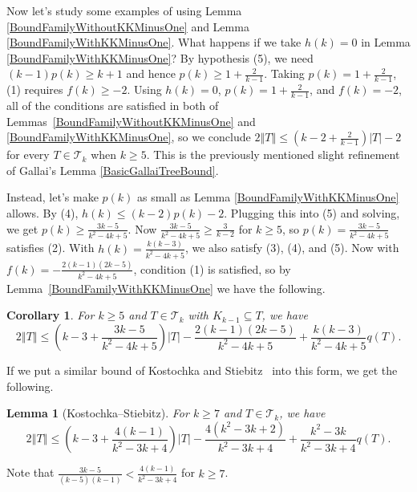 \documentclass[12pt]{article}
\theoremstyle{plain}
\newtheorem{lem}[thm]{Lemma}
\newtheorem{cor}[thm]{Corollary}
\theoremstyle{definition}
\theoremstyle{remark}
\newcommand{\fancy}[1]{\mathcal{#1}}
\newcommand{\T}{\fancy{T}}
\newcommand{\card}[1]{\left|#1\right|}
\newcommand{\size}[1]{\left\Vert#1\right\Vert}
\newcommand{\parens}[1]{\left( #1 \right)}
\begin{document}
Now let's study some examples of using Lemma \ref{BoundFamilyWithoutKKMinusOne}
and Lemma \ref{BoundFamilyWithKKMinusOne}.  What happens if we take $h(k) = 0$
in Lemma \ref{BoundFamilyWithKKMinusOne}?  By hypothesis (5), we need
$(k-1)p(k) \ge k + 1$ and hence $p(k) \ge 1 + \frac{2}{k-1}$.  Taking $p(k) = 1 +
\frac{2}{k-1}$, (1) requires $f(k) \ge -2$.  Using $h(k)=0$,
$p(k)=1+\frac2{k-1}$, and $f(k) = -2$, all of the conditions are satisfied in
both of Lemmas~\ref{BoundFamilyWithoutKKMinusOne} and
\ref{BoundFamilyWithKKMinusOne}, so we conclude $2\size{T} \le \parens{k-2 +
\frac{2}{k-1}}\card{T} - 2$ for every $T \in \T_k$ when $k \ge 5$.  This is the
previously mentioned slight refinement of Gallai's Lemma \ref{BasicGallaiTreeBound}.

Instead, let's make $p(k)$ as small as Lemma \ref{BoundFamilyWithKKMinusOne}
allows. By (4), $h(k) \le (k-2)p(k) - 2$. Plugging this into (5) and solving,
we get $p(k) \ge \frac{3k-5}{k^2 - 4k + 5}$.  Now $\frac{3k-5}{k^2 - 4k + 5}
\ge \frac{3}{k-2}$ for $k \ge 5$, so $p(k) = \frac{3k-5}{k^2 - 4k + 5}$
satisfies (2).  With $h(k) = \frac{k(k-3)}{k^2 - 4k + 5}$, we also satisfy (3),
(4), and (5).  Now with $f(k) = -\frac{2(k-1)(2k-5)}{k^2 - 4k + 5}$, condition
(1) is satisfied, so by Lemma~\ref{BoundFamilyWithKKMinusOne} we have the following.

\begin{cor}\label{SmallP}
	For $k \ge 5$ and $T \in \T_k$ with $K_{k-1} \subseteq T$, we have
	\[2\size{T} \le \parens{k-3 + \frac{3k-5}{k^2 - 4k + 5}}\card{T} - \frac{2(k-1)(2k-5)}{k^2 - 4k + 5} + 
	\frac{k(k-3)}{k^2 - 4k + 5}q(T).\]
\end{cor}

If we put a similar bound of Kostochka and
Stiebitz~\cite{kostochkastiebitzedgesincriticalgraph} into this form, we get
the following.
\begin{lem}[Kostochka--Stiebitz]




		For $k \ge 7$ and $T \in \T_k$, we have
		\[2\size{T} \le \parens{k-3 + \frac{4(k-1)}{k^2 - 3k + 4}}\card{T} - \frac{4(k^2-3k+2)}{k^2-3k+4} + 
		\frac{k^2 - 3k}{k^2-3k+4}q(T).\]
\end{lem}
\noindent
Note that $\frac{3k-5}{(k-5)(k-1)} < \frac{4(k-1)}{k^2 - 3k + 4}$ for $k \ge 7$.
\end{document}
